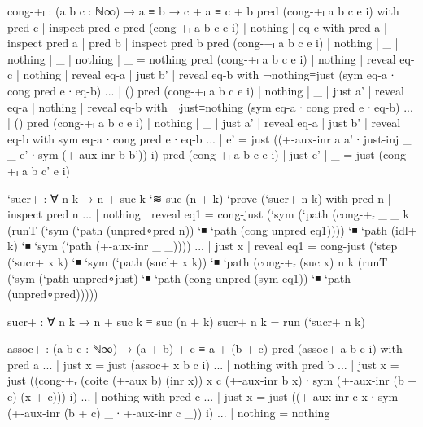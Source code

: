 \begin{code}
cong-+ₗ : (a b c : ℕ∞) → a ≡ b → c + a ≡ c + b
pred (cong-+ₗ a b c e i) with pred c | inspect pred c
pred (cong-+ₗ a b c e i) | nothing | eq-c with pred a | inspect pred a | pred b | inspect pred b
pred (cong-+ₗ a b c e i) | nothing | _           | nothing | _           | nothing | _ = nothing
pred (cong-+ₗ a b c e i) | nothing | reveal eq-c | nothing | reveal eq-a | just b' | reveal eq-b with ¬nothing≡just (sym eq-a ∙ cong pred e ∙ eq-b)
... | ()
pred (cong-+ₗ a b c e i) | nothing | _ | just a' | reveal eq-a | nothing | reveal eq-b with ¬just≡nothing (sym eq-a ∙ cong pred e ∙ eq-b)
... | ()
pred (cong-+ₗ a b c e i) | nothing | _ | just a' | reveal eq-a | just b' | reveal eq-b with sym eq-a ∙ cong pred e ∙ eq-b
... | e' = just ((+-aux-inr a a' ∙ just-inj _ _ e' ∙ sym (+-aux-inr b b')) i)
pred (cong-+ₗ a b c e i) | just c' | _ = just (cong-+ₗ a b c' e i)

`sucr+ : ∀ n k → n + suc k `≋ suc (n + k)
`prove (`sucr+ n k) with pred n | inspect pred n
... | nothing | reveal eq1 = cong-just (`sym (`path (cong-+ᵣ _ _ k (runT (`sym (`path (unpred∘pred {n})) `◾ `path (cong unpred eq1)))) `◾ `path (idl+ k) `◾ `sym (`path (+-aux-inr _ _))))
... | just x  | reveal eq1 = cong-just (`step (`sucr+ x k) `◾ `sym (`path (sucl+ x k)) `◾ `path (cong-+ᵣ (suc x) n k (runT (`sym (`path unpred∘just) `◾ `path (cong unpred (sym eq1)) `◾ `path (unpred∘pred)))))

sucr+ : ∀ n k → n + suc k ≡ suc (n + k)
sucr+ n k = run (`sucr+ n k)

assoc+ : (a b c : ℕ∞) → (a + b) + c ≡ a + (b + c)
pred (assoc+ a b c i) with pred a
... | just x = just (assoc+ x b c i)
... | nothing with pred b
... | just x = just ((cong-+ᵣ (coite (+-aux b) (inr x)) x c (+-aux-inr b x) ∙ sym (+-aux-inr (b + c) (x + c))) i)
... | nothing with pred c
... | just x = just ((+-aux-inr c x ∙ sym (+-aux-inr (b + c) _ ∙ +-aux-inr c _)) i)
... | nothing = nothing


\end{code}
